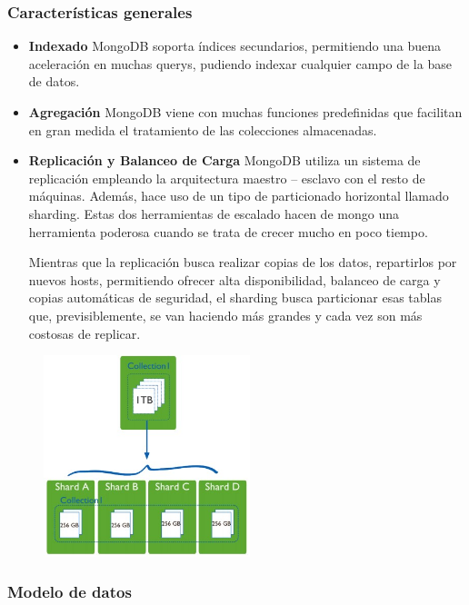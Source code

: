 \documentclass[preprint,12pt]{elsarticle}
\begin{document}
\subsubsection{\textbf{Características generales}}
\begin{itemize}
\item 
\textbf{Indexado}\newline
MongoDB soporta índices secundarios, permitiendo una buena aceleración en muchas querys, pudiendo indexar cualquier campo de la base de datos.
\item 
\textbf{Agregación}\newline
MongoDB viene con muchas funciones predefinidas que facilitan en gran medida el tratamiento de las colecciones almacenadas.
\item
\textbf{Replicación y Balanceo de Carga}\newline
MongoDB utiliza un sistema de replicación empleando la arquitectura maestro – esclavo con el resto de máquinas. Además, hace uso de un tipo de particionado horizontal llamado sharding. Estas dos herramientas de escalado hacen de mongo una herramienta poderosa cuando se trata de crecer mucho en poco tiempo.

Mientras que la replicación busca realizar copias de los datos, repartirlos por nuevos hosts, permitiendo ofrecer alta disponibilidad, balanceo de carga y copias automáticas de seguridad, el sharding busca particionar esas tablas que, previsiblemente, se van haciendo más grandes y cada vez son más costosas de replicar.
\end{itemize}


\begin{figure}[htb]
	\begin{center}
		\includegraphics[width=6cm]{./IMAGENES/img01} %
	\end{center}
\end{figure}

\subsubsection{\textbf{Modelo de datos}}
\end{document}
